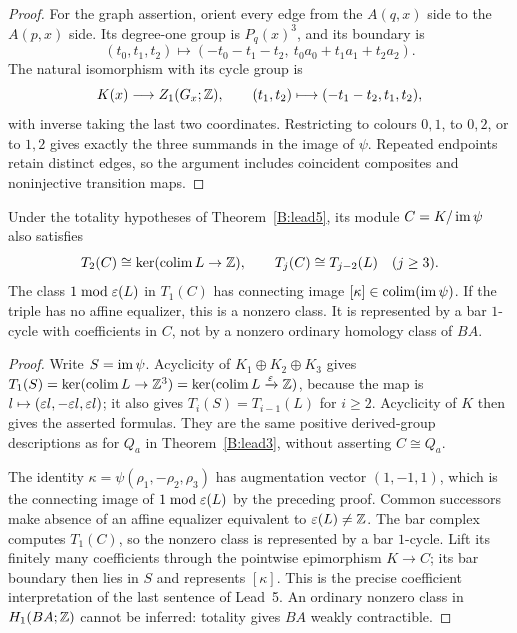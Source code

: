 \begin{proof}
For the graph assertion, orient every edge from the $A(q,x)$ side to the $A(p,x)$ side. Its degree-one group is $P_q(x)^3$, and its boundary is
\[
 (t_0,t_1,t_2)\longmapsto
 (-t_0-t_1-t_2,\ t_0a_0+t_1a_1+t_2a_2).
\]
The natural isomorphism with its cycle group is
\[
 K(x)\longrightarrow Z_1(G_x;\mathbb Z),\qquad
 (t_1,t_2)\longmapsto(-t_1-t_2,t_1,t_2),
\]
with inverse taking the last two coordinates. Restricting to colours $0,1$, to $0,2$, or to $1,2$ gives exactly the three summands in the image of $\psi$. Repeated endpoints retain distinct edges, so the argument includes coincident composites and noninjective transition maps.
\end{proof}

\begin{corollary}\label{B:mixed-cycle}
Under the totality hypotheses of Theorem~\ref{B:lead5}, its module $C=K/\operatorname{im}\psi$ also satisfies
\[
 T_2(C)\cong\ker(\operatorname*{colim} L\to\mathbb Z),\qquad
 T_j(C)\cong T_{j-2}(L)\quad(j\geq3).
\]
The class $1\bmod\varepsilon(L)$ in $T_1(C)$ has connecting image $[\kappa]\in\operatorname*{colim}(\operatorname{im}\psi)$. If the triple has no affine equalizer, this is a nonzero class. It is represented by a bar $1$-cycle with coefficients in $C$, not by a nonzero ordinary homology class of $BA$.
\end{corollary}
\begin{proof}
Write $S=\operatorname{im}\psi$. Acyclicity of $K_1\oplus K_2\oplus K_3$ gives
$T_1(S)=\ker(\operatorname*{colim} L\to\mathbb Z^3)=\ker(\operatorname*{colim} L\xrightarrow{\varepsilon}\mathbb Z)$, because the map is $l\mapsto(\varepsilon l,-\varepsilon l,\varepsilon l)$; it also gives $T_i(S)=T_{i-1}(L)$ for $i\geq2$. Acyclicity of $K$ then gives the asserted formulas. They are the same positive derived-group descriptions as for $Q_a$ in Theorem~\ref{B:lead3}, without asserting $C\cong Q_a$.

The identity $\kappa=\psi(\rho_1,-\rho_2,\rho_3)$ has augmentation vector $(1,-1,1)$, which is the connecting image of $1\bmod\varepsilon(L)$ by the preceding proof. Common successors make absence of an affine equalizer equivalent to $\varepsilon(L)\ne\mathbb Z$. The bar complex computes $T_1(C)$, so the nonzero class is represented by a bar $1$-cycle. Lift its finitely many coefficients through the pointwise epimorphism $K\to C$; its bar boundary then lies in $S$ and represents $[\kappa]$. This is the precise coefficient interpretation of the last sentence of Lead~5. An ordinary nonzero class in $H_1(BA;\mathbb Z)$ cannot be inferred: totality gives $BA$ weakly contractible.
\end{proof}
